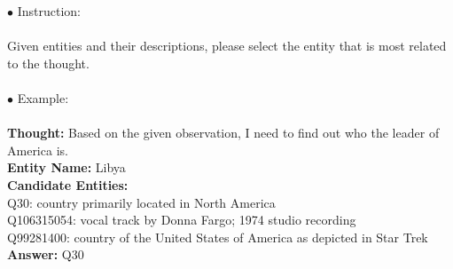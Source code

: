 \begin{tcolorbox}[prompt=
{\begin{prompt} \label{prompts for selecting entity}The Prompt for Entity Selection
\end{prompt}}]
$\bullet$ Instruction: \\ \\
Given entities and their descriptions, please select the entity that is most related to the thought. \\ 
\\
$\bullet$ Example: \\ \\
\textbf{Thought: }Based on the given observation, I need to find out who the leader of America is. \\
\textbf{Entity Name: }Libya \\
\textbf{Candidate Entities:} \\
Q30: country primarily located in North America \\
Q106315054: vocal track by Donna Fargo; 1974 studio recording \\
Q99281400: country of the United States of America as depicted in Star Trek \\
\textbf{Answer: }Q30
\end{tcolorbox}